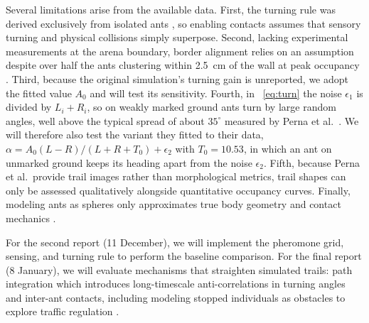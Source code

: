 \documentclass[9pt,twoside]{pnas-new}
\begin{document}
Several limitations arise from the available data. First, the turning rule was derived exclusively from isolated ants \cite{perna2012}, so enabling contacts assumes that sensory turning and physical collisions simply superpose. Second, lacking experimental measurements at the arena boundary, border alignment relies on an assumption despite over half the ants clustering within 2.5~cm of the wall at peak occupancy \cite{perna2012}. Third, because the original simulation's turning gain is unreported, we adopt the fitted value $A_0$ and will test its sensitivity. Fourth, in ~\eqref{eq:turn} the noise $\epsilon_1$ is divided by $L_i+R_i$, so on weakly marked ground ants turn by large random angles, well above the typical spread of about $35^\circ$ measured by Perna et al.\ \cite{perna2012}. We will therefore also test the variant they fitted to their data, $\alpha = A_0 (L-R)/(L+R+T_0) + \epsilon_2$ with $T_0 = 10.53$, in which an ant on unmarked ground keeps its heading apart from the noise $\epsilon_2$. Fifth, because Perna et al.\ provide trail images rather than morphological metrics, trail shapes can only be assessed qualitatively alongside quantitative occupancy curves. Finally, modeling ants as spheres only approximates true body geometry and contact mechanics \cite{loges2025}.

For the second report (11 December), we will implement the pheromone grid, sensing, and turning rule to perform the baseline comparison. For the final report (8 January), we will evaluate mechanisms that straighten simulated trails: path integration which introduces long-timescale anti-correlations in turning angles \cite{perna2012} and inter-ant contacts, including modeling stopped individuals as obstacles to explore traffic regulation \cite{dobramysl2025}.




\end{document}
